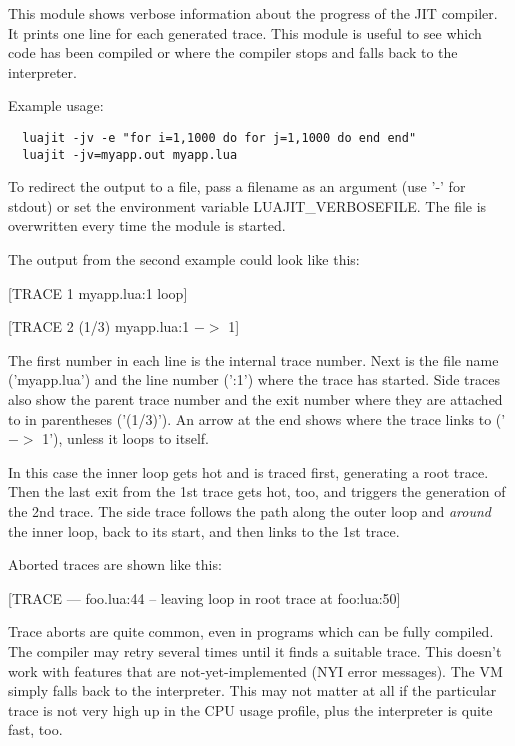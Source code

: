 
This module shows verbose information about the progress of the
JIT compiler. It prints one line for each generated trace. This module
is useful to see which code has been compiled or where the compiler
stops and falls back to the interpreter.

Example usage:

\begin{lstlisting}
  luajit -jv -e "for i=1,1000 do for j=1,1000 do end end"
  luajit -jv=myapp.out myapp.lua
\end{lstlisting}
To redirect the output to a file, pass a
filename as an argument (use '-' for stdout) or set the environment
variable LUAJIT\_VERBOSEFILE. The file is overwritten every time the
module is started.

The output from the second example could look like this:

\begin{center}
[TRACE   1 myapp.lua:1 loop]

[TRACE   2 (1/3) myapp.lua:1 $->$ 1]
\end{center}

The first number in each line is the internal trace number. Next is
the file name ('myapp.lua') and the line number (':1') where the
trace has started. Side traces also show the parent trace number and
the exit number where they are attached to in parentheses ('(1/3)').
An arrow at the end shows where the trace links to ('$->$ 1'), unless
it loops to itself.

In this case the inner loop gets hot and is traced first, generating
a root trace. Then the last exit from the 1st trace gets hot, too,
and triggers the generation of the 2nd trace. The side trace follows the
path along the outer loop and \textit{around} the inner loop, back to its
start, and then links to the 1st trace.

Aborted traces are shown like this:
\begin{center}
[TRACE --- foo.lua:44 -- leaving loop in root trace at foo:lua:50]
\end{center}

Trace aborts are quite common, even in programs which
can be fully compiled. The compiler may retry several times until it
finds a suitable trace. This doesn't work with features that are
not-yet-implemented (NYI error messages). The VM simply falls back to the
interpreter. This may not matter at all if the particular trace is not very high
up in the CPU usage profile, plus the interpreter is quite fast, too.